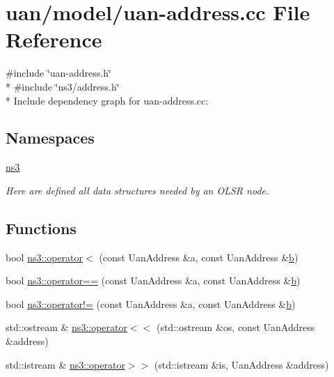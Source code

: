 \hypertarget{uan-address_8cc}{}\section{uan/model/uan-\/address.cc File Reference}
\label{uan-address_8cc}
{\ttfamily \#include \char`\"{}uan-\/address.\+h\char`\"{}}\\*
{\ttfamily \#include \char`\"{}ns3/address.\+h\char`\"{}}\\*
Include dependency graph for uan-\/address.cc\+:
\subsection*{Namespaces}
\begin{DoxyCompactItemize}
\item 
 \hyperlink{namespacens3}{ns3}
\begin{DoxyCompactList}\small\item\em Here are defined all data structures needed by an O\+L\+SR node. \end{DoxyCompactList}\end{DoxyCompactItemize}
\subsection*{Functions}
\begin{DoxyCompactItemize}
\item 
bool \hyperlink{namespacens3_a4e164634d259f221f73be7c6e9568fa1}{ns3\+::operator$<$} (const Uan\+Address \&a, const Uan\+Address \&\hyperlink{lte__pathloss_8m_a21ad0bd836b90d08f4cf640b4c298e7c}{b})
\item 
bool \hyperlink{namespacens3_a477f04ddfcb7de32ae7aa5b4580b74ee}{ns3\+::operator==} (const Uan\+Address \&a, const Uan\+Address \&\hyperlink{lte__pathloss_8m_a21ad0bd836b90d08f4cf640b4c298e7c}{b})
\item 
bool \hyperlink{namespacens3_aff92bf91afb562dae9481b2de7a6e8c9}{ns3\+::operator!=} (const Uan\+Address \&a, const Uan\+Address \&\hyperlink{lte__pathloss_8m_a21ad0bd836b90d08f4cf640b4c298e7c}{b})
\item 
std\+::ostream \& \hyperlink{namespacens3_aaddc30e0b41c8c47380bac7ee7b29cbe}{ns3\+::operator$<$$<$} (std\+::ostream \&os, const Uan\+Address \&address)
\item 
std\+::istream \& \hyperlink{namespacens3_a0afe2a857cd06951b3b101de2e0c1540}{ns3\+::operator$>$$>$} (std\+::istream \&is, Uan\+Address \&address)
\end{DoxyCompactItemize}
